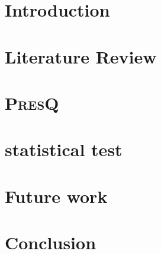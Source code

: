 \documentclass[12pt]{book}
\newcommand{\PresQ}[0]{\textsc{PresQ}\xspace}
\begin{document}
\mainmatter

\chapter{Introduction}
\label{chapter:introduction}


\chapter{Literature Review}
\label{chapter:literature_review}


\chapter{\PresQ}
\label{chapter:edd}


\chapter{ statistical test}
\label{chapter:som}


\chapter{Future work}
\label{chapter:future_work}


\chapter{Conclusion}
\label{chapter:conclusions}


\printbibliography[heading=bibintoc]

\backmatter

\begin{refsection}
\nocite{Alvarez2019,Alvarez2021inference}

\printbibliography[heading=bibintoc,title={List of Publications}]
\end{refsection}
\end{document}
